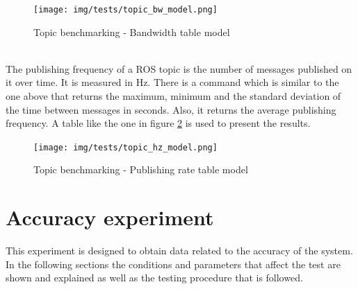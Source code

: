 \begin{itemize}
		\begin{figure}[H]
				\begin{center}
			    \texttt{[image: img/tests/topic\_bw\_model.png]}
				\caption[Topic benchmarking - Bandwidth table model]{Topic benchmarking - Bandwidth table model}
				\label{topic_bw_model}
				\end{center}
		\end{figure}
		\\

		The publishing frequency of a ROS topic is the number of messages published on it over time. 
		It is measured in Hz. 
		There is a command which is similar to the one above that returns the maximum, minimum and the standard deviation of the time between messages in seconds. 
		Also, it returns the average publishing frequency.  
		A table like the one in figure \ref{topic_hz_model} is used to present the results.

		\begin{figure}[H]
				\begin{center}
			    \texttt{[image: img/tests/topic\_hz\_model.png]}
				\caption[Topic benchmarking - Publishing rate table model]{Topic benchmarking - Publishing rate table model}
								\label{topic_hz_model}
				\end{center}
		\end{figure}
			\end{itemize}

\newpage

\section{Accuracy experiment}

	This experiment is designed to obtain data related to the accuracy of the system. 
	In the following sections the conditions and parameters that affect the test are shown and explained as well as the testing procedure that is followed. 



